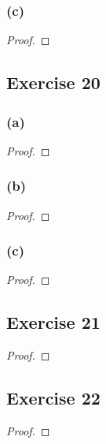 \documentclass[14pt]{extarticle}
\begin{document}
\subsubsection{(c)}

\begin{proof}

\end{proof}

\subsection{Exercise 20}

\subsubsection{(a)}

\begin{proof}

\end{proof}

\subsubsection{(b)}

\begin{proof}

\end{proof}

\subsubsection{(c)}

\begin{proof}

\end{proof}

\subsection{Exercise 21}

\begin{proof}

\end{proof}

\subsection{Exercise 22}

\begin{proof}

\end{proof}
\end{document}
